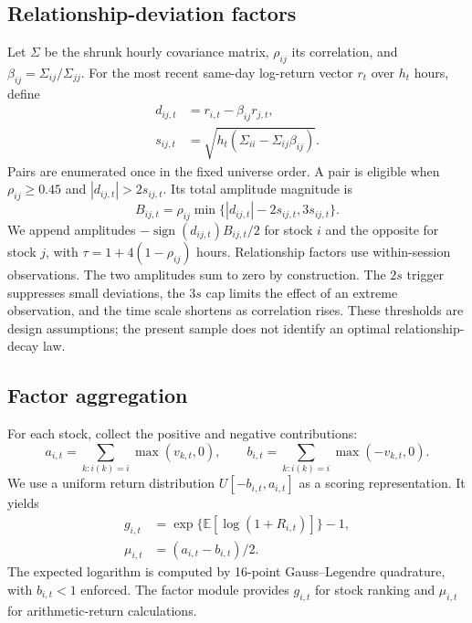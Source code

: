 \documentclass[conference]{IEEEtran}
\begin{document}
\subsection{Relationship-deviation factors}
Let $\Sigma$ be the shrunk hourly covariance matrix, $\rho_{ij}$ its correlation, and $\beta_{ij}=\Sigma_{ij}/\Sigma_{jj}$. For the most recent same-day log-return vector $r_t$ over $h_t$ hours, define
\begin{align}
 d_{ij,t}&=r_{i,t}-\beta_{ij}r_{j,t},\\
 s_{ij,t}&=\sqrt{h_t(\Sigma_{ii}-\Sigma_{ij}\beta_{ij})}.
\end{align}
Pairs are enumerated once in the fixed universe order. A pair is eligible when $\rho_{ij}\geq0.45$ and $|d_{ij,t}|>2s_{ij,t}$. Its total amplitude magnitude is
\begin{equation}
 B_{ij,t}=\rho_{ij}\min\{|d_{ij,t}|-2s_{ij,t},3s_{ij,t}\}.
\end{equation}
We append amplitudes $-\operatorname{sign}(d_{ij,t})B_{ij,t}/2$ for stock $i$ and the opposite for stock $j$, with $\tau=1+4(1-\rho_{ij})$ hours. Relationship factors use within-session observations.
The two amplitudes sum to zero by construction. The $2s$ trigger suppresses small deviations, the $3s$ cap limits the effect of an extreme observation, and the time scale shortens as correlation rises. These thresholds are design assumptions; the present sample does not identify an optimal relationship-decay law.

\subsection{Factor aggregation}
For each stock, collect the positive and negative contributions:
\begin{equation}
 a_{i,t}=\sum_{k:i(k)=i}\max(v_{k,t},0),\qquad
 b_{i,t}=\sum_{k:i(k)=i}\max(-v_{k,t},0).
\end{equation}
We use a uniform return distribution $U[-b_{i,t},a_{i,t}]$ as a scoring representation. It yields
\begin{align}
 g_{i,t}&=\exp\{\mathbb{E}[\log(1+R_{i,t})]\}-1,\\
 \mu_{i,t}&=(a_{i,t}-b_{i,t})/2.
\end{align}
The expected logarithm is computed by 16-point Gauss--Legendre quadrature, with $b_{i,t}<1$ enforced. The factor module provides $g_{i,t}$ for stock ranking and $\mu_{i,t}$ for arithmetic-return calculations.
\end{document}
